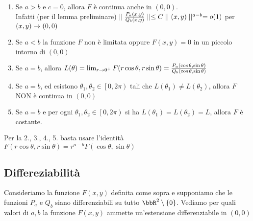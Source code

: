 \documentclass[a4paper,NoNotes,GeneralMath]{stdmdoc}
\begin{document}
	\begin{enumerate}
		\item Se $a > b$ e $c = 0$, allora $F$ è continua anche in $(0,0)$. \\
			Infatti (per il lemma preliminare) $\mid\mid \frac{P_a(x,y)}{Q_b(x,y)} \mid\mid \le C \mid\mid (x,y) \mid\mid^{a-b} = o(1)$ per $(x,y) \rightarrow (0,0)$
		\item Se $a < b$ la funzione $F$ non è limitata oppure $F(x,y) = 0$ in un piccolo intorno di $(0,0)$
		\item Se $a = b$, allora $L(\theta) = \lim_{r \rightarrow 0^{+}} F(r \cos \theta, r \sin \theta) = \frac{P_a (\cos \theta, \sin \theta)}{Q_b(\cos \theta, \sin\theta)}$
		\item Se $a = b$, ed esistono $\theta_1, \theta_2 \in \left[ 0, 2 \pi \right)$ tali che $L(\theta_1) \neq L(\theta_2)$, allora $F$ NON è continua in $(0,0)$
		\item Se $a = b$ e per ogni $\theta_1, \theta_2 \in \left[0, 2\pi \right)$ si ha $L(\theta_1) = L(\theta_2) = L$, allora $F$ è costante.
	\end{enumerate}
	Per la 2., 3., 4., 5. basta usare l'identità $F(r \cos \theta, r \sin \theta) = r^{a-b} F(\cos \theta, \sin \theta)$ \\
	
	\subsection{Differeziabilità}
	Consideriamo la funzione $F(x,y)$ definita come sopra e supponiamo che le funzioni $P_a$ e $Q_b$ siano differenziabili su tutto $\bbR^2 \setminus \{0\}$.
	Vediamo per quali valori di $a,b$ la funzione $F(x,y)$ ammette un'estensione differenziabile in $(0,0)$
	
\end{document}
